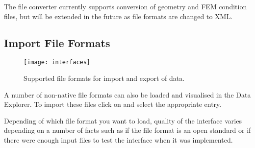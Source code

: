 The file converter currently supports conversion of geometry and FEM condition files, but will be extended in the future as file formats are changed to XML.

\subsection{Import File Formats}
\label{Import File Formats}

\begin{figure}[tb]
\begin{center}
\texttt{[image: interfaces]}
\caption{Supported file formats for import and export of data.}
\label{fig:interfaces}
\end{center}
\end{figure}

A number of non-native file formats can also be loaded and visualised in the Data Explorer. To import these files click on  and select the appropriate entry.

Depending of which file format you want to load, quality of the interface varies depending on a number of facts such as if the file format is an open standard or if there were enough input files to test the interface when it was implemented.

